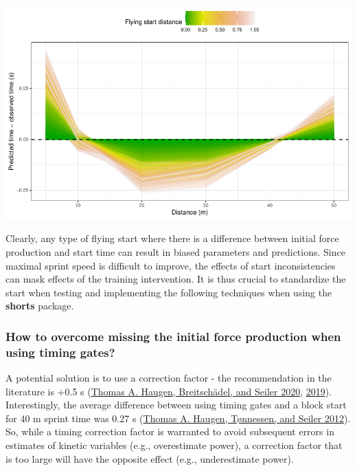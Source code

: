 \documentclass[fleqn,10pt,lineno]{wlpeerj} %
\begin{document}
\begin{center}\includegraphics[width=1\linewidth]{paper_files/figure-latex/unnamed-chunk-38-1} \end{center}

Clearly, any type of flying start where there is a difference between initial force production and start time can result in biased parameters and predictions. Since maximal sprint speed is difficult to improve, the effects of start inconsistencies can mask effects of the training intervention. It is thus crucial to standardize the start when testing and implementing the following techniques when using the \textbf{shorts} package.

\hypertarget{how-to-overcome-missing-the-initial-force-production-when-using-timing-gates}{%
\subsubsection{How to overcome missing the initial force production when using timing gates?}\label{how-to-overcome-missing-the-initial-force-production-when-using-timing-gates}}

A potential solution is to use a correction factor - the recommendation in the literature is +0.5 s (\protect\hyperlink{ref-haugenSprintMechanicalProperties2020}{Thomas A. Haugen, Breitschädel, and Seiler 2020}, \protect\hyperlink{ref-haugenSprintMechanicalVariables2019}{2019}). Interestingly, the average difference between using timing gates and a block start for 40 m sprint time was 0.27 s (\protect\hyperlink{ref-haugenDifferenceStartImpact2012}{Thomas A. Haugen, Tønnessen, and Seiler 2012}). So, while a timing correction factor is warranted to avoid subsequent errors in estimates of kinetic variables (e.g., overestimate power), a correction factor that is too large will have the opposite effect (e.g., underestimate power).
\end{document}

